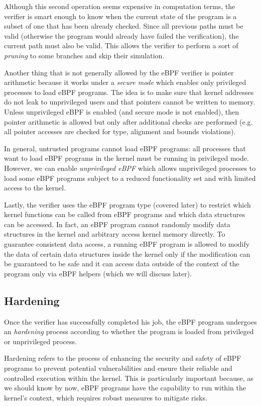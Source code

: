 Although this second operation seems expensive in computation terms, the verifier is smart enough to know when the current state of the program is a subset of one that has been already checked. 
Since all previous paths must be valid (otherwise the program would already have failed the verification), the current path must also be valid. 
This allows the verifier to perform a sort of \textit{pruning} to some branches and skip their simulation.

Another thing that is not generally allowed by the eBPF verifier is pointer arithmetic because it works under a \textit{secure mode} which enables only privileged processes to load eBPF programs.
The idea is to make sure that kernel addresses do not leak to unprivileged users and that pointers cannot be written to memory. 
Unless unprivileged eBPF is enabled (and secure mode is not enabled), then pointer arithmetic is allowed but only after additional checks are performed (e.g. all pointer accesses are checked for type, alignment and bounds violations).

In general, untrusted programs cannot load eBPF programs: all processes that want to load eBPF programs in the kernel must be running in privileged mode.
However, we can enable \textit{unprivileged eBPF} which allows unprivileged processes to load some eBPF programs subject to a reduced functionality set and with limited access to the kernel.

Lastly, the verifier uses the eBPF program type (covered later) to restrict which kernel functions can be called from eBPF programs and which data structures can be accessed. 
In fact, an eBPF program cannot randomly modify data structures in the kernel and arbitrary access kernel memory directly.
To guarantee consistent data access, a running eBPF program is allowed to modify the data of certain data structures inside the kernel only if the modification can be guaranteed to be safe and it can access data outside of the context of the program only via eBPF helpers (which we will discuss later).

\subsection{Hardening}

Once the verifier has successfully completed his job, the eBPF program undergoes an \textit{hardening} process according to whether the program is loaded from privileged or unprivileged process.

Hardening refers to the process of enhancing the security and safety of eBPF programs to prevent potential vulnerabilities and ensure their reliable and controlled execution within the kernel. 
This is particularly important because, as we should know by now, eBPF programs have the capability to run within the kernel's context, which requires robust measures to mitigate risks.

